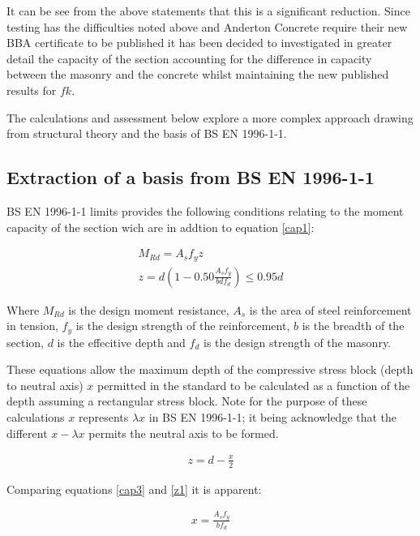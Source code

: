 \documentclass[11pt]{article}
\begin{document}
    It can be see from the above statements that this is a significant
reduction. Since testing has the difficulties noted above and Anderton
Concrete require their new BBA certificate to be published it has been
decided to investigated in greater detail the capacity of the section
accounting for the difference in capacity between the masonry and the
concrete whilst maintaining the new published results for \(fk\).

The calculations and assessment below explore a more complex approach
drawing from structural theory and the basis of BS EN 1996-1-1.

    \hypertarget{extraction-of-a-basis-from-bs-en-1996-1-1}{%
\subsection{Extraction of a basis from BS EN
1996-1-1}\label{extraction-of-a-basis-from-bs-en-1996-1-1}}

BS EN 1996-1-1 limits provides the following conditions relating to the
moment capacity of the section wich are in addtion to equation
\ref{cap1}:

\begin{align}
M_{Rd} = A_s f_y z\\
z = d ( 1 - 0.50 \frac{A_s f_y}{b d f_d}) \leq 0.95 d
\end{align}

Where \(M_{Rd}\) is the design moment resistance, \(A_s\) is the area of
steel reinforcement in tension, \(f_y\) is the design strength of the
reinforcement, \(b\) is the breadth of the section, \(d\) is the
effecitive depth and \(f_d\) is the design strength of the masonry.

These equations allow the maximum depth of the compressive stress block
(depth to neutral axis) \(x\) permitted in the standard to be calculated
as a function of the depth assuming a rectangular stress block. Note for
the purpose of these calculations \(x\) represents \(\lambda x\) in BS
EN 1996-1-1; it being acknowledge that the different \(x-\lambda x\)
permits the neutral axis to be formed.

\begin{align}
   z = d - \frac{x}{2}
   \end{align}

Comparing equations \ref{cap3} and \ref{z1} it is apparent:

\begin{align}
   x = \frac{A_s f_y}{b f_d}
   \end{align}
\end{document}
